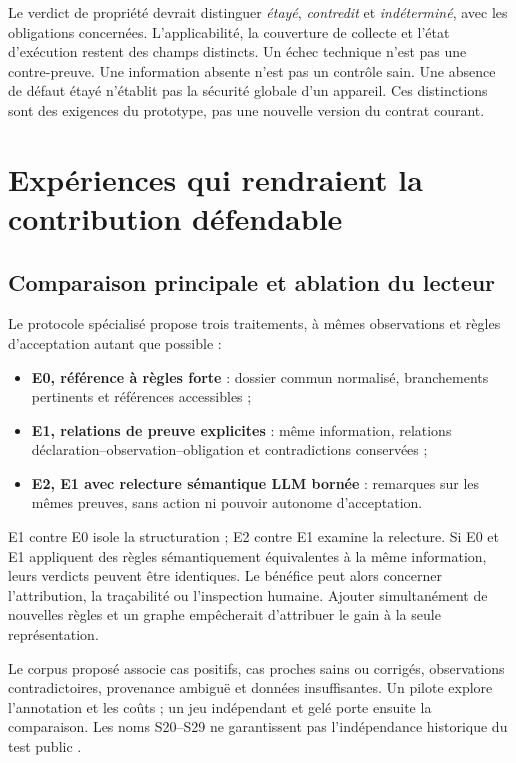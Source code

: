 \documentclass[11pt,a4paper]{article}
\begin{document}
Le verdict de propriété devrait distinguer \emph{étayé}, \emph{contredit} et
\emph{indéterminé}, avec les obligations concernées. L'applicabilité, la
couverture de collecte et l'état d'exécution restent des champs distincts.
Un échec technique n'est pas une contre-preuve. Une information absente n'est
pas un contrôle sain. Une absence de défaut étayé n'établit pas la sécurité
globale d'un appareil. Ces distinctions sont des exigences du prototype,
pas une nouvelle version du contrat courant.

\section{Expériences qui rendraient la contribution défendable}
\subsection{Comparaison principale et ablation du lecteur}
Le protocole spécialisé \cite{protocole} propose trois traitements, à mêmes
observations et règles d'acceptation autant que possible :
\begin{itemize}
\item \textbf{E0, référence à règles forte} : dossier commun normalisé,
      branchements pertinents et références accessibles ;
\item \textbf{E1, relations de preuve explicites} : même information,
      relations déclaration--observation--obligation et contradictions conservées ;
\item \textbf{E2, E1 avec relecture sémantique LLM bornée} : remarques sur
      les mêmes preuves, sans action ni pouvoir autonome d'acceptation.
\end{itemize}
E1 contre E0 isole la structuration ; E2 contre E1 examine la relecture.
Si E0 et E1 appliquent des règles sémantiquement équivalentes à la même
information, leurs verdicts peuvent être identiques. Le bénéfice peut alors
concerner l'attribution, la traçabilité ou l'inspection humaine. Ajouter
simultanément de nouvelles règles et un graphe empêcherait d'attribuer le gain
à la seule représentation.

Le corpus proposé associe cas positifs, cas proches sains ou corrigés,
observations contradictoires, provenance ambiguë et données insuffisantes.
Un pilote explore l'annotation et les coûts ; un jeu indépendant et gelé
porte ensuite la comparaison. Les noms S20--S29 ne garantissent pas
l'indépendance historique du test public \cite{corpus}.
\end{document}
